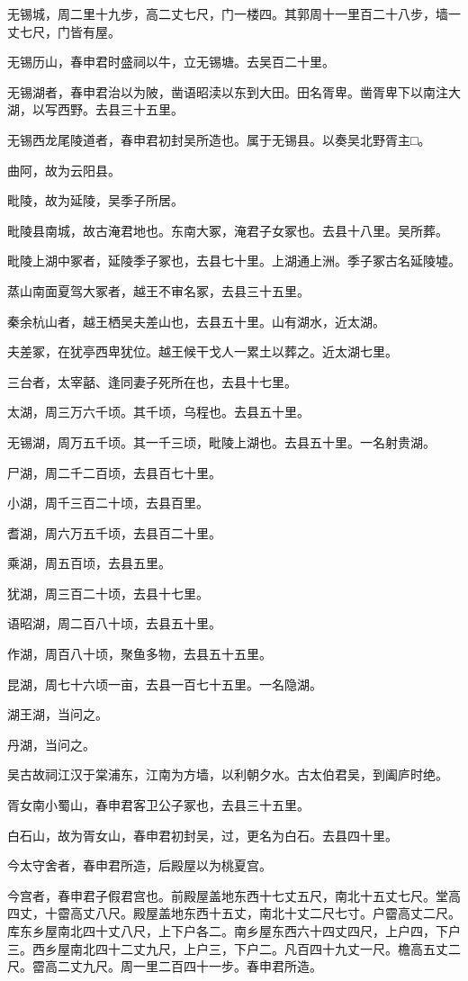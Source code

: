 \documentclass[12pt,UTF8]{ctexbook}
\begin{document}
无锡城，周二里十九步，高二丈七尺，门一楼四。其郭周十一里百二十八步，墙一丈七尺，门皆有屋。

无锡历山，春申君时盛祠以牛，立无锡塘。去吴百二十里。

无锡湖者，春申君治以为陂，凿语昭渎以东到大田。田名胥卑。凿胥卑下以南注大湖，以写西野。去县三十五里。

无锡西龙尾陵道者，春申君初封吴所造也。属于无锡县。以奏吴北野胥主□。

曲阿，故为云阳县。

毗陵，故为延陵，吴季子所居。

毗陵县南城，故古淹君地也。东南大冢，淹君子女冢也。去县十八里。吴所葬。

毗陵上湖中冢者，延陵季子冢也，去县七十里。上湖通上洲。季子冢古名延陵墟。

蒸山南面夏驾大冢者，越王不审名冢，去县三十五里。

秦余杭山者，越王栖吴夫差山也，去县五十里。山有湖水，近太湖。

夫差冢，在犹亭西卑犹位。越王候干戈人一累土以葬之。近太湖七里。

三台者，太宰嚭、逢同妻子死所在也，去县十七里。

太湖，周三万六千顷。其千顷，乌程也。去县五十里。

无锡湖，周万五千顷。其一千三顷，毗陵上湖也。去县五十里。一名射贵湖。

尸湖，周二千二百顷，去县百七十里。

小湖，周千三百二十顷，去县百里。

耆湖，周六万五千顷，去县百二十里。

乘湖，周五百顷，去县五里。

犹湖，周三百二十顷，去县十七里。

语昭湖，周二百八十顷，去县五十里。

作湖，周百八十顷，聚鱼多物，去县五十五里。

昆湖，周七十六顷一亩，去县一百七十五里。一名隐湖。

湖王湖，当问之。

丹湖，当问之。

吴古故祠江汉于棠浦东，江南为方墙，以利朝夕水。古太伯君吴，到阖庐时绝。

胥女南小蜀山，春申君客卫公子冢也，去县三十五里。

白石山，故为胥女山，春申君初封吴，过，更名为白石。去县四十里。

今太守舍者，春申君所造，后殿屋以为桃夏宫。

今宫者，春申君子假君宫也。前殿屋盖地东西十七丈五尺，南北十五丈七尺。堂高四丈，十霤高丈八尺。殿屋盖地东西十五丈，南北十丈二尺七寸。户霤高丈二尺。库东乡屋南北四十丈八尺，上下户各二。南乡屋东西六十四丈四尺，上户四，下户三。西乡屋南北四十二丈九尺，上户三，下户二。凡百四十九丈一尺。檐高五丈二尺。霤高二丈九尺。周一里二百四十一步。春申君所造。
\end{document}
